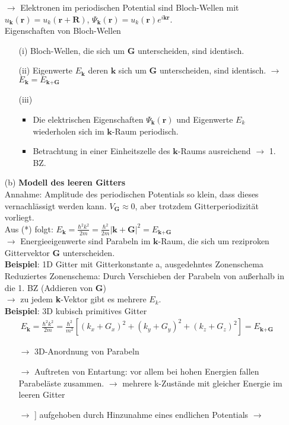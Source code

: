 \begin{itemize}
    $\rightarrow$ Elektronen im periodischen Potential sind Bloch-Wellen mit $u_{\textbf{k}}(\textbf{r}) = u_k(\textbf{r} + \textbf{R})$, $\Psi_{\textbf{k}} (\textbf{r}) = u_k(\textbf{r}) e^{i\textbf{k}\textbf{r}}$. \\
    Eigenschaften von Bloch-Wellen
    \begin{itemize}
        \item[(i)] Bloch-Wellen, die sich um $ \textbf{G} $ unterscheiden, sind identisch.
        \item[(ii)] Eigenwerte $E_{\textbf{k}}$ deren $ \textbf{k} $ sich um $ \textbf{G} $ unterscheiden, sind identisch. $\rightarrow$  $E_{\textbf{k}} = E_{\textbf{k}+\textbf{G}}$
        \item[(iii)]
        \begin{itemize}
            \item Die elektrischen Eigenschaften $\Psi_{\textbf{k}} (\textbf{r})$ und Eigenwerte $E_k$ wiederholen sich im $\textbf{k}$-Raum periodisch.
            \item Betrachtung in einer Einheitszelle des $\textbf{k}$-Raums ausreichend $\rightarrow$ 1. BZ.
        \end{itemize}
    \end{itemize}
    \item[(b)] \textbf{Modell des leeren Gitters}\\
    Annahme: Amplitude des periodischen Potentials so klein, dass dieses vernachlässigt werden kann. $V_{\textbf{G}}\approx 0$, aber trotzdem Gitterperiodizität vorliegt.\\
    Aus (*) folgt: $ E_{\textbf{k}} = \frac{\hbar^2k^2}{2m} = \frac{\hbar^2}{2m} \left|\textbf{k}+\textbf{G}\right|^2 = E_{\textbf{k} + \textbf{G}}$ \\
    $\rightarrow$ Energieeigenwerte sind Parabeln im $\textbf{k}$-Raum, die sich um reziproken Gittervektor $\textbf{G}$ unterscheiden. \\
    \textbf{Beispiel}: 1D Gitter mit Gitterkonstante a, ausgedehntes Zonenschema \\ %
    Reduziertes Zonenschema: Durch Verschieben der Parabeln von außerhalb in die 1. BZ (Addieren von $\textbf{G}$) \\ %
    $\rightarrow$ zu jedem \textbf{k}-Vektor gibt es mehrere $E_k$. \\
    \textbf{Beispiel}: 3D kubisch primitives Gitter
    \begin{align}
        E_{\textbf{k}} = \frac{\hbar^2k^2}{2m} = \frac{\hbar^2}{m^2}\left[(k_x+G_x)^2 + (k_y+G_y)^2 + (k_z+G_z)^2\right] = E_{\textbf{k}+\textbf{G}}
    \end{align}
    \begin{itemize}
    \item[$\rightarrow$] 3D-Anordnung von Parabeln
    \item[$\rightarrow$] Auftreten von Entartung: vor allem bei hohen Energien fallen Parabeläste zusammen. $\rightarrow$ mehrere k-Zustände mit gleicher Energie im leeren Gitter
    \item[$\rightarrow$]] aufgehoben durch Hinzunahme eines endlichen Potentials $\rightarrow$ 
    \end{itemize}


\end{itemize}
